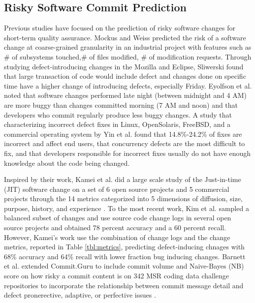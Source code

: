 \documentclass[sigconf,review, anonymous]{acmart}
\begin{document}
\subsection{Risky Software Commit Prediction}

Previous studies have focused on the prediction of risky software changes for short-term quality assurance. Mockus and Weiss predicted the risk of a software change at coarse-grained granularity in an industrial project with features such as \# of subsystems touched,\# of files modified, \# of modification requests. Through studying defect-introducing changes in the Mozilla and Eclipse, Sliwerski \cite{Sliwerski05changes} found that large transaction of code would include defect and changes done on specific time have a higher change of introducing defects, especially Friday. Eyolfson et al. \cite{Eyolfson11bugginess} noted that software changes performed late night (between midnight and 4 AM) are more buggy than changes committed morning (7 AM and noon) and that developers who commit regularly produce less buggy changes.  A study
that characterizing incorrect defect fixes in Linux, OpenSolaris, FreeBSD, and a commercial operating system by Yin et al. \cite{Yin11fixes} found that 14.8\%-24.2\%  of fixes are incorrect and affect end users, that concurrency defects are the most difficult to fix, and that developers responsible for incorrect fixes usually do not have enough knowledge about the code being changed.

Inspired by their work, Kamei et al. did a large scale study of the Just-in-time (JIT) software change on a set of 6 open source projects and 5 commercial projects through the 14 metrics categorized into 5 dimensions of diffusion, size, purpose, history, and experience  \cite{kamei12_jit}. To the most recent work, Kim et al. \cite{Kim08changes} sampled a balanced subset of changes and use source code change logs in several open source projects and obtained 78 percent
accuracy and a 60 percent recall. However, Kamei's work use the combination of change logs and the change metrics, reported in Table \ref{tbl:metrics}, predicting defect-inducing chnages with 68\% accuracy and 64\% recall with lower fraction bug inducing changes. 
Barnett et al. extended Commit.Guru to include commit volume and Naive-Bayes (NB) score on how risky a commit content is on 342 MSR coding data challenge repositories to incorporate the relationship between commit message detail and defect pronerective, adaptive, or perfective issues \cite{barnett13_mcontent}.  
\end{document}
